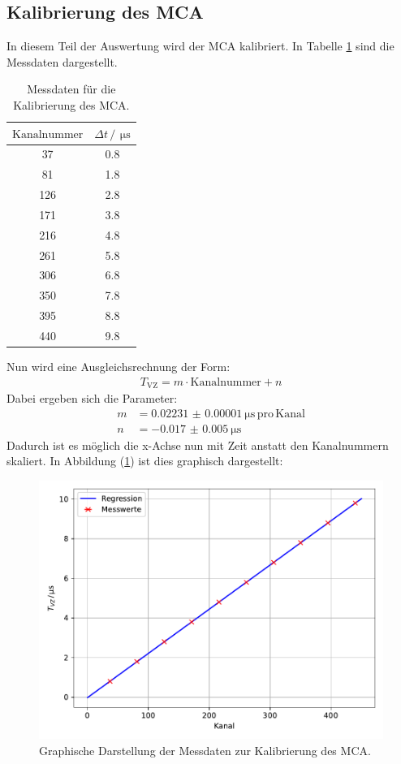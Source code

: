\subsection{Kalibrierung des MCA}
In diesem Teil der Auswertung wird der MCA kalibriert. In Tabelle \ref{tab:tab4} sind die Messdaten dargestellt.
\begin{table}
  \centering
  \caption{Messdaten für die Kalibrierung des MCA.}
  \label{tab:tab4}
  \begin{tabular}{c c}
    \toprule
		$\mathrm{Kanalnummer}$ & $\Delta t\, / \, \SI{}{\micro\second}$ \\
    \midrule
		37 & 0.8 \\
		81 & 1.8 \\
		126 & 2.8 \\
		171 & 3.8 \\
		216 & 4.8 \\
		261 & 5.8 \\
		306 & 6.8 \\
		350 & 7.8 \\
		395 & 8.8 \\
		440 & 9.8 \\
    \bottomrule
  \end{tabular}
\end{table}
\FloatBarrier
\noindent Nun wird eine Ausgleichsrechnung der Form:
\begin{align*}
	T_\mathrm{VZ}=m\cdot \mathrm{Kanalnummer} + n
\end{align*}
Dabei ergeben sich die Parameter:
\begin{align*}
	m &= \SI{0.02231(1)}{\micro\second} \, \mathrm{pro} \, \mathrm{Kanal} \\
	n &= \SI{-0.017(5)}{\micro\second}
\end{align*}
Dadurch ist es möglich die x-Achse nun mit Zeit anstatt den Kanalnummern skaliert. In Abbildung (\ref{fig:Kanal}) ist dies graphisch dargestellt:
\begin{figure}
	\centering
	\includegraphics[scale=0.7]{fig/Kanal.pdf}
	\caption{Graphische Darstellung der Messdaten zur Kalibrierung des MCA.}
	\label{fig:Kanal}
\end{figure}
\FloatBarrier
